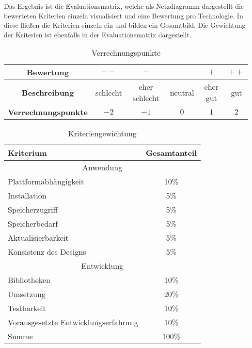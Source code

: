 Das Ergebnis ist die Evaluationsmatrix, welche als Netzdiagramm dargestellt die bewerteten Kriterien einzeln visualisiert und eine Bewertung pro Technologie. In diese fließen die Kriterien einzeln ein und bilden ein Gesamtbild. Die Gewichtung der Kriterien ist ebenfalls in der Evaluationsmatrix dargestellt.
\begin{table}[h!]
	\centering
	\begin{tabular}{|c|c|c|c|c|c|}
		\hline 	
			\textbf{Bewertung} & $--$ & $-$ & \Circle & $+$ & $++$ \\ 
		\hline 
			\textbf{Beschreibung} & schlecht & eher schlecht & neutral & eher gut & gut \\ 
		\hline 
			\textbf{Verrechnungspunkte} & $-2$ & $-1$ & $0$ & $1$ & $2$ \\ 
		\hline 		
	\end{tabular} 
	\caption{Verrechnungspunkte} \label{tab:verrechnungspunkte}
\end{table}

\begin{table}[h!]
	\centering
	\begin{tabular}{|l|c|}
		\hline
		Kriterium              & Gesamtanteil \\
		\hline
		\multicolumn{2}{c}{Anwendung}     \\
		\hline
		Plattformabhängigkeit   & 10\%         \\
		Installation           & 5\%          \\
		Speicherzugriff        & 5\%          \\
		Speicherbedarf         & 5\%          \\
		Aktualisierbarkeit     & 5\%          \\
		Konsistenz des Designs & 5\%         \\
		
		\hline
		\multicolumn{2}{c}{Entwicklung}     \\
		\hline
		Bibliotheken           & 10\%         \\
		Umsetzung              & 20\%         \\
		Testbarkeit            & 10\%         \\
		Vorausgesetzte Entwicklungserfahrung    & 10\%         \\
		\hline
		\hline
		Summe                  & 100\%        \\
		\hline
	\end{tabular}
	\caption{Kriteriengewichtung} \label{tab:punktekatalog}
\end{table}

